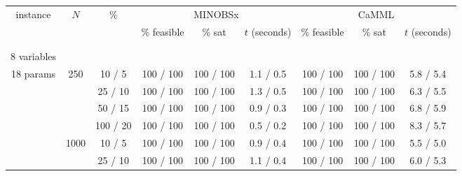 \documentclass[twoside,11pt]{article}
\begin{document}
\begin{table}[ht]
\scriptsize
\renewcommand\theadfont{}
\centering
\begin{tabular}{@{}c | c | c || c | c | c || c | c | c@{}}


\multirow{2}{*}{instance} & \multirow{2}{*}{$N$} & \multirow{2}{*}{$\%$} & \multicolumn{3}{c||}{MINOBSx} & \multicolumn{3}{c}{CaMML} \\ [2ex]
	& & &  \% feasible & \% sat & $t$ (seconds) & \% feasible & \% sat & $t$ (seconds) \\
	
\hhline {=|=|=||=|=|=||=|=|=}

\multirow{8}{*}{\thead{\textbf{asia} \\ \\ 8 variables \\ 18 params}} & \multirow{4}{*}{250} 

& 10 / 5  & 100 / 100 & 100 / 100 & 1.1 / 0.5 & 100 / 100 & 100 / 100 & 5.8 / 5.4 \\

& & 25 / 10 & 100 / 100 & 100 / 100 & 1.3 / 0.5  & 100 / 100 & 100 / 100 & 6.3 / 5.5 \\
	
& & 50 / 15 & 100 / 100 & 100 / 100 & 0.9 / 0.3 & 100 / 100 & 100 / 100 & 6.8 / 5.9 \\

& & 100 / 20 & 100 / 100 & 100 / 100  & 0.5 / 0.2 & 100 / 100 & 100 / 100 & 8.3 / 5.7 \\

\hhline {~|-|-||-|-|-||-|-|-}

& \multirow{4}{*}{1000}

& 10 / 5 & 100 / 100 & 100 / 100 & 0.9 / 0.4 & 100 / 100 & 100 / 100 & 5.5 / 5.0  \\

& & 25 / 10 & 100 / 100 & 100 / 100 & 1.1 / 0.4 & 100 / 100 & 100 / 100 & 6.0 / 5.3 \\
	

\end{tabular}
\end{table}
\end{document}
